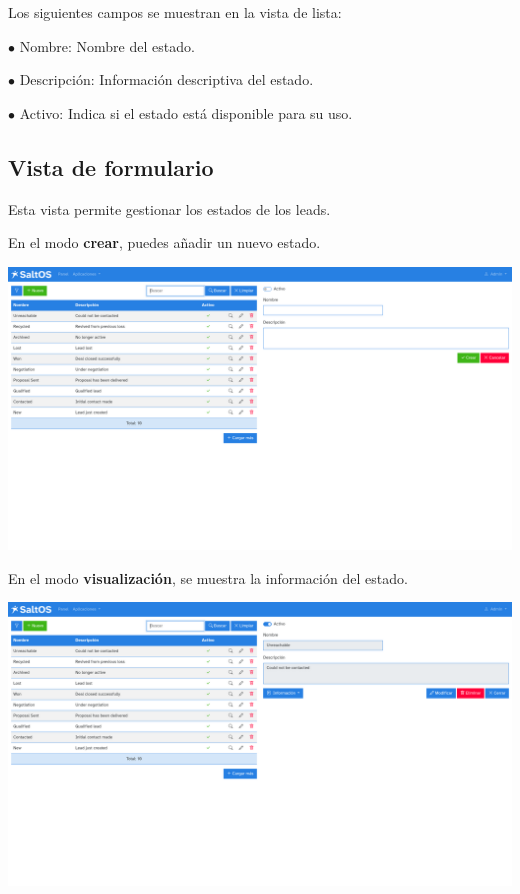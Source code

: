 \documentclass[a4paper]{article}
\begin{document}
Los siguientes campos se muestran en la vista de lista:

\begin{compactitem}
\item[\color{myblue}$\bullet$] Nombre: Nombre del estado.
\item[\color{myblue}$\bullet$] Descripción: Información descriptiva del estado.
\item[\color{myblue}$\bullet$] Activo: Indica si el estado está disponible para su uso.
\end{compactitem}

\hypertarget{toc64}{}
\subsection{Vista de formulario}

Esta vista permite gestionar los estados de los leads.

En el modo \textbf{crear}, puedes añadir un nuevo estado.

\begin{center}\includegraphics[width=1\textwidth]{../ujest/snaps/test-screenshots-js-screenshots-crm-leads-status-create-es-es-1-snap.png}\end{center}

En el modo \textbf{visualización}, se muestra la información del estado.

\begin{center}\includegraphics[width=1\textwidth]{../ujest/snaps/test-screenshots-js-screenshots-crm-leads-status-view-10-es-es-1-snap.png}\end{center}
\end{document}
